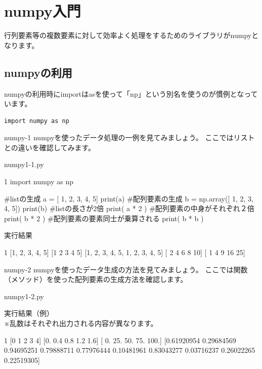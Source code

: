 \section{numpy入門}
行列要素等の複数要素に対して効率よく処理をするためのライブラリがnumpyとなります。
\subsection{numpyの利用}

numpyの利用時にimportはasを使って「np」という別名を使うのが慣例となっています。

\begin{verbatim}
import numpy as np

\end{verbatim}


\begin{pabox}{numpy-1}
numpyを使ったデータ処理の一例を見てみましょう。
ここではリストとの違いを確認してみます。

\begin{legbox}{numpy1-1.py}
\begin{listing}{1}
import numpy as np

#listの生成
a = [ 1, 2, 3, 4, 5]
print(a)
#配列要素の生成
b = np.array([ 1, 2, 3, 4, 5])
print(b)
#listの長さが2倍
print( a * 2 )
#配列要素の中身がそれぞれ２倍
print( b * 2 )
#配列要素の要素同士が乗算される
print( b * b )
\end{listing}

実行結果\\
\begin{listing}{1}
[1, 2, 3, 4, 5]
[1 2 3 4 5]
[1, 2, 3, 4, 5, 1, 2, 3, 4, 5]
[ 2  4  6  8 10]
[ 1  4  9 16 25]
\end{listing}
\end{legbox}

\end{pabox}

\begin{pabox}{numpy-2}
numpyを使ったデータ生成の方法を見てみましょう。
ここでは関数（メソッド）を使った配列要素の生成方法を確認します。

\begin{legbox}{numpy1-2.py}

実行結果（例）\\
※乱数はそれぞれ出力される内容が異なります。\\
\begin{listing}{1}
[0 1 2 3 4]
[0.  0.4 0.8 1.2 1.6]
[  0.  25.  50.  75. 100.]
[0.61920954 0.29684569 0.94695251 0.79888711 0.77976444 0.10481961
 0.83043277 0.03716237 0.26022265 0.22519305]
\end{listing}
\end{legbox}

\end{pabox}



